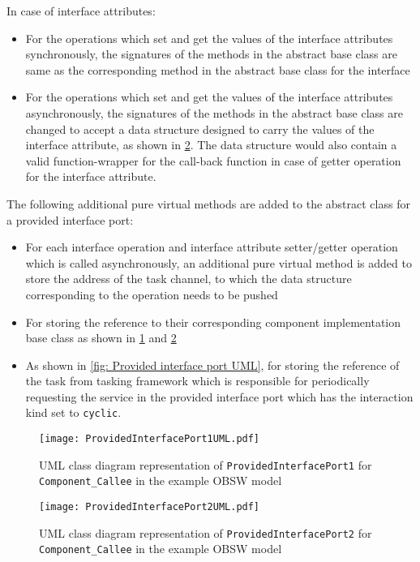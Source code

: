 In case of interface attributes:
\begin{itemize}
\item For the operations which set and get the values of the interface attributes synchronously, the signatures of the methods in the abstract base class are same as the corresponding method in the abstract base class for the interface
\item For the operations which set and get the values of the interface attributes asynchronously, the signatures of the methods in the abstract base class are changed to accept a data structure designed to carry the values of the interface attribute, as shown in \cref{fig: Provided interface port2 UML}. The data structure would also contain a valid function-wrapper for the call-back function in case of getter operation for the interface attribute.  
\end{itemize}

The following additional pure virtual methods are added to the abstract class for a provided interface port:
\begin{itemize}
\item For each interface operation and interface attribute setter/getter operation which is called asynchronously, an additional pure virtual method is added to store the address of the task channel, to which the data structure corresponding to the operation needs to be pushed
\item For storing the reference to their corresponding component implementation base class as shown in \cref{fig: Provided interface port1 UML} and \cref{fig: Provided interface port2 UML}
\item As shown in \cref{fig: Provided interface port UML}, for storing the reference of the task from tasking framework which is responsible for periodically requesting the service in the provided interface port which has the interaction kind set to \texttt{cyclic}. 
\end{itemize}

\begin{figure}[h]
	\centering
	\texttt{[image: ProvidedInterfacePort1UML.pdf]}
	\caption{UML class diagram representation of \texttt{Provided\allowbreak Interface\allowbreak Port1} for \texttt{Component\allowbreak\_Callee} in the example OBSW model}
	\label{fig: Provided interface port1 UML}
\end{figure}

\begin{figure}[h]
	\centering
	\texttt{[image: ProvidedInterfacePort2UML.pdf]}
	\caption{UML class diagram representation of \texttt{Provided\allowbreak Interface\allowbreak Port2} for \texttt{Component\allowbreak\_Callee} in the example OBSW model}
	\label{fig: Provided interface port2 UML}
\end{figure}


